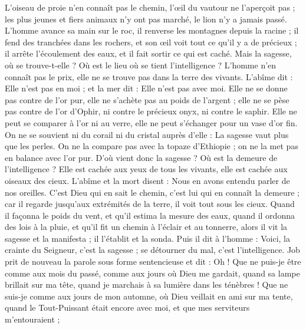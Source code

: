 \begin{multicols}{2}
L'oiseau de proie n'en connaît pas le chemin, l'œil du vautour ne l'aperçoit pas ;
les plus jeunes et fiers animaux n'y ont pas marché, le lion n'y a jamais passé.
L'homme avance sa main sur le roc, il renverse les montagnes depuis la racine ;
il fend des tranchées dans les rochers, et son œil voit tout ce qu'il y a de précieux ;
il arrête l'écoulement des eaux, et il fait sortir ce qui est caché.
Mais la sagesse, où se trouve-t-elle ? Où est le lieu où se tient l'intelligence ?
L'homme n'en connaît pas le prix, elle ne se trouve pas dans la terre des vivants.
L'abîme dit : Elle n'est pas en moi ; et la mer dit : Elle n'est pas avec moi.
Elle ne se donne pas contre de l'or pur, elle ne s'achète pas au poids de l'argent ;
elle ne se pèse pas contre de l'or d'Ophir, ni contre le précieux onyx, ni contre le saphir.
Elle ne peut se comparer à l'or ni au verre, elle ne peut s'échanger pour un vase d'or fin.
On ne se souvient ni du corail ni du cristal auprès d'elle : La sagesse vaut plus que les perles.
On ne la compare pas avec la topaze d'Ethiopie ; on ne la met pas en balance avec l'or pur.
D'où vient donc la sagesse ? Où est la demeure de l'intelligence ?
Elle est cachée aux yeux de tous les vivants, elle est cachée aux oiseaux des cieux.
L'abîme et la mort disent : Nous en avons entendu parler de nos oreilles.
C'est Dieu qui en sait le chemin, c'est lui qui en connaît la demeure ;
car il regarde jusqu'aux extrémités de la terre, il voit tout sous les cieux.
Quand il façonna le poids du vent, et qu'il estima la mesure des eaux,
quand il ordonna des lois à la pluie, et qu'il fit un chemin à l'éclair et au tonnerre,
alors il vit la sagesse et la manifesta ; il l'établit et la sonda.
Puis il dit à l'homme : Voici, la crainte du Seigneur, c'est la sagesse ; se détourner du mal, c'est l'intelligence.
\VerseOne{}Job prit de nouveau la parole sous forme sentencieuse et dit :
Oh ! Que ne puis-je être comme aux mois du passé, comme aux jours où Dieu me gardait,
quand sa lampe brillait sur ma tête, quand je marchais à sa lumière dans les ténèbres !
Que ne suis-je comme aux jours de mon automne, où Dieu veillait en ami sur ma tente,
quand le Tout-Puissant était encore avec moi, et que mes serviteurs m'entouraient ;

\end{multicols}
